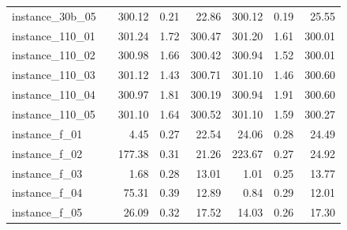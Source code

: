 \documentclass[12pt,a4paper,openright,twoside]{book}
\begin{document}
\begin{table}[H]
{\begin{tabular}{|ll|rrr|rrr|}
instance\_30b\_05             &     &  300.12 &     0.21 &    22.86 &  300.12 &     0.19 &    25.55 \\ 
instance\_110\_01            &     &  301.24 &     1.72 &   300.47 &  301.20 &     1.61 &   300.01 \\ 
instance\_110\_02            &     &  300.98 &     1.66 &   300.42 &  300.94 &     1.52 &   300.01 \\ 
instance\_110\_03            &     &  301.12 &     1.43 &   300.71 &  301.10 &     1.46 &   300.60 \\ 
instance\_110\_04            &     &  300.97 &     1.81 &   300.19 &  300.94 &     1.91 &   300.60 \\ 
instance\_110\_05            &     &  301.10 &     1.64 &   300.52 &  301.10 &     1.59 &   300.27 \\ 
instance\_f\_01              &     &     4.45 &    0.27 &    22.54 &   24.06 &     0.28 &    24.49   \\  
instance\_f\_02              &     &   177.38 &    0.31 &    21.26 &   223.67 &     0.27 &    24.92  \\  
instance\_f\_03              &     &     1.68 &    0.28 &    13.01 &     1.01 &     0.25 &    13.77  \\  
instance\_f\_04              &     &    75.31 &    0.39 &    12.89 &     0.84 &     0.29 &    12.01  \\  
instance\_f\_05              &     &    26.09 &    0.32 &    17.52 &    14.03 &     0.26 &    17.30  \\  
 
\hline
\end{tabular}
}
\end{table}
\end{document}
